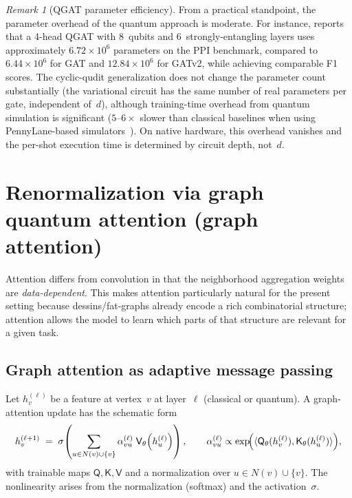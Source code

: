\documentclass[11pt,oneside]{amsbook}
\numberwithin{equation}{section}
\theoremstyle{plain}
\theoremstyle{definition}
\theoremstyle{remark}
\newtheorem{remark}[theorem]{Remark}
\begin{document}
\begin{remark}[QGAT parameter efficiency]
From a practical standpoint, the parameter overhead of the quantum approach is moderate.
For instance, \cite{Ning2025QGAT} reports that a 4-head QGAT with 8~qubits and 6~strongly-entangling layers uses approximately $6.72\times 10^6$ parameters on the PPI benchmark, compared to $6.44\times 10^6$ for GAT and $12.84\times 10^6$ for GATv2, while achieving comparable F1 scores.
The cyclic-qudit generalization does not change the parameter count substantially (the variational circuit has the same number of real parameters per gate, independent of~$d$), although training-time overhead from quantum simulation is significant ($5$--$6\times$ slower than classical baselines when using PennyLane-based simulators~\cite{Ning2025QGAT}).
On native hardware, this overhead vanishes and the per-shot execution time is determined by circuit depth, not~$d$.
\end{remark}


\section{Renormalization via graph quantum attention (graph attention)}
\label{sec:graph_qattn}

Attention differs from convolution in that the neighborhood aggregation weights are
\emph{data-dependent}. This makes attention particularly natural for the present setting because
dessins/fat-graphs already encode a rich combinatorial structure; attention allows the model to
learn which parts of that structure are relevant for a given task.

\subsection{Graph attention as adaptive message passing}
Let $h_v^{(\ell)}$ be a feature at vertex~$v$ at layer~$\ell$ (classical or quantum).
A graph-attention update has the schematic form
\begin{equation}
  h_v^{(\ell+1)}
  \;=\;
  \sigma\!\left(
    \sum_{u\in N(v)\cup\{v\}} \alpha_{vu}^{(\ell)}\;\mathsf{V}_\theta\!\left(h_u^{(\ell)}\right)
  \right),
  \qquad
  \alpha_{vu}^{(\ell)} \propto
  \exp\!\Bigl(\langle \mathsf{Q}_\theta(h_v^{(\ell)}),\mathsf{K}_\theta(h_u^{(\ell)})\rangle\Bigr),
  \label{eq:graph_attention_classical}
\end{equation}
with trainable maps $\mathsf{Q},\mathsf{K},\mathsf{V}$ and a normalization over $u\in N(v)\cup\{v\}$.
The nonlinearity arises from the normalization (softmax) and the activation~$\sigma$.
\end{document}
